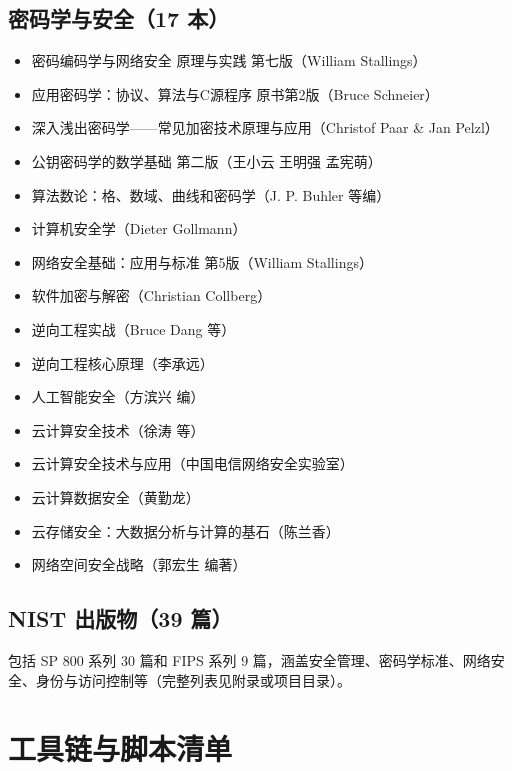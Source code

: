 \documentclass[12pt,a4paper]{ctexart}
\begin{document}
\subsection{密码学与安全（17 本）}

\begin{itemize}
    \item 密码编码学与网络安全 原理与实践 第七版（William Stallings）
    \item 应用密码学：协议、算法与C源程序 原书第2版（Bruce Schneier）
    \item 深入浅出密码学——常见加密技术原理与应用（Christof Paar \& Jan Pelzl）
    \item 公钥密码学的数学基础 第二版（王小云 王明强 孟宪萌）
    \item 算法数论：格、数域、曲线和密码学（J. P. Buhler 等编）
    \item 计算机安全学（Dieter Gollmann）
    \item 网络安全基础：应用与标准 第5版（William Stallings）
    \item 软件加密与解密（Christian Collberg）
    \item 逆向工程实战（Bruce Dang 等）
    \item 逆向工程核心原理（李承远）
    \item 人工智能安全（方滨兴 编）
    \item 云计算安全技术（徐涛 等）
    \item 云计算安全技术与应用（中国电信网络安全实验室）
    \item 云计算数据安全（黄勤龙）
    \item 云存储安全：大数据分析与计算的基石（陈兰香）
    \item 网络空间安全战略（郭宏生 编著）
\end{itemize}

\subsection{NIST 出版物（39 篇）}

包括 SP 800 系列 30 篇和 FIPS 系列 9 篇，涵盖安全管理、密码学标准、网络安全、身份与访问控制等（完整列表见附录或项目目录）。

\section{工具链与脚本清单}
\end{document}

